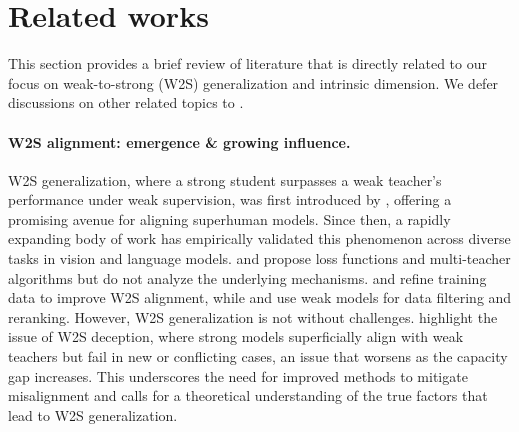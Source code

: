 \section{Related works}
This section provides a brief review of literature that is directly related to our focus on weak-to-strong (W2S) generalization and intrinsic dimension. We defer discussions on other related topics to .

\paragraph{W2S alignment: emergence \& growing influence.}
W2S generalization, where a strong student surpasses a weak teacher's performance under weak supervision, was first introduced by \cite{burns2023weak}, offering a promising avenue for aligning superhuman models. Since then, a rapidly expanding body of work has empirically validated this phenomenon across diverse tasks in vision and language models. \citet{guo2024visionsuperalignmentweaktostronggeneralization} and \citet{liu2024cosupervisedlearningimprovingweaktostrong} propose loss functions and multi-teacher algorithms but do not analyze the underlying mechanisms. \citet{guo2024improvingweaktostronggeneralizationreliabilityaware} and \citet{yang2024weaktostrongreasoning} refine training data to improve W2S alignment, while \citet{li2024superfilteringweaktostrongdatafiltering} and \citet{sun2024easytohardgeneralizationscalablealignment} use weak models for data filtering and reranking.
However, W2S generalization is not without challenges. \citet{yang2024superficialalignmentstrongmodelsdeceive} highlight the issue of W2S deception, where strong models superficially align with weak teachers but fail in new or conflicting cases, an issue that worsens as the capacity gap increases. This underscores the need for improved methods to mitigate misalignment and calls for a theoretical understanding of the true factors that lead to W2S generalization.

